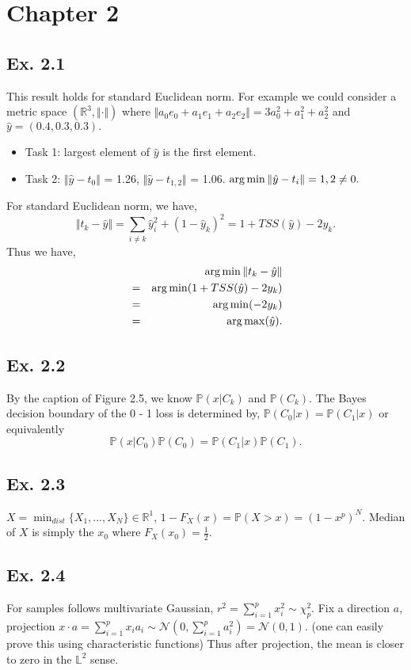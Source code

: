 \section*{Chapter 2}
\subsection*{Ex. 2.1}
This result holds for standard Euclidean norm. For example we could consider a metric space $(\mathbb{R}^3, \Vert\cdot\Vert)$ where
$\Vert a_0 e_0 + a_1 e_1 + a_2 e_2\Vert= 3 a_0^2 + a_1^2 + a_2^2$ and $\hat{y} = (0.4, 0.3, 0.3).$
\begin{itemize}
  \item Task 1: largest element of $\hat{y}$ is the first element.
  \item Task 2: $\Vert \hat{y} - t_0 \Vert $ = 1.26, $\Vert \hat{y} - t_{1, 2} \Vert $ = 1.06. $\operatorname*{arg\,min} \Vert \hat{y} - t_{i} \Vert = 1, 2 \neq 0.$
\end{itemize}
For standard Euclidean norm, we have,
  $$\Vert t_k - \hat{y}\Vert =  \sum_{i\neq k}\hat{y}^2_i + (1 - \hat{y}_{k})^2 = 1 + TSS(\hat{y}) - 2y_{k}.$$
Thus we have,
\begin{eqnarray*}
  & & \operatorname*{arg\,min}\Vert t_k - \hat{y}\Vert \\
  &=& \operatorname*{arg\,min}(1 + TSS(\hat{y}) - 2y_{k}) \\
  &=& \operatorname*{arg\,min}(- 2y_{k}) \\
  &=& \operatorname*{arg\,max}(\hat{y}).
\end{eqnarray*}

\subsection*{Ex. 2.2}
By the caption of Figure 2.5, we know $\mathbb{P}(x | C_{k})$ and $\mathbb{P}(C_{k})$. The  Bayes decision boundary of the 0 - 1 loss is determined by, $\mathbb{P}(C_{0} | x) = \mathbb{P}(C_{1} | x)$ or equivalently
$$\mathbb{P}(x | C_{0})\mathbb{P}(C_{0}) = \mathbb{P}(C_{1} | x) \mathbb{P}(C_{1}).$$

\subsection*{Ex. 2.3}
$X = \min_{dist} \{X_1,...,X_N\} \in \mathbb{R}^1$, $1 - F_X(x) = \mathbb{P}(X > x) = (1 - x^p)^N.$ Median of $X$ is simply the $x_0$ where $F_X(x_0) = \frac{1}{2}.$

\subsection*{Ex. 2.4}
For samples follows multivariate Gaussian, $r^2 = \sum_{i=1}^{p} x_i^2 \sim \chi^2_{p}.$ Fix a direction $a$, projection $x \cdot a = \sum_{i=1}^{p} x_i a_i \sim \mathcal{N}(0, \sum_{i=1}^{p}a_{i}^2) = \mathcal{N}(0, 1).$ (one can easily prove this using characteristic functions) Thus after projection, the mean is closer to zero in the $\mathbb{L}^2$ sense.

